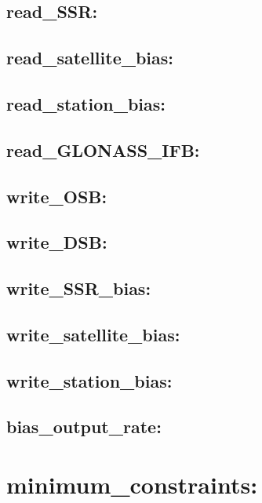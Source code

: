 \subsection{read\_SSR:}

\subsection{read\_satellite\_bias:}

\subsection{read\_station\_bias:}

\subsection{read\_GLONASS\_IFB:}

\subsection{write\_OSB:}

\subsection{write\_DSB:}

\subsection{write\_SSR\_bias:}

\subsection{write\_satellite\_bias:}

\subsection{write\_station\_bias:}

\subsection{bias\_output\_rate:}






\section{minimum\_constraints:}


